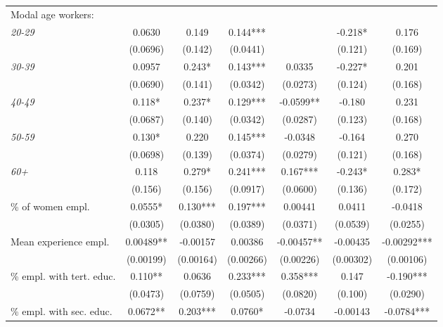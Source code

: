 \begin{threeparttable}
\begin{tabular}{l*{6}{S}}
Modal age workers:        \\[1ex]
\quad \textit{20-29}      &  0.0630    & 0.149      & 0.144***   &            & -0.218*   & 0.176       \\
                          &  (0.0696)  & (0.142)    & (0.0441)   &            & (0.121)   & (0.169)     \\[1ex]
\quad \textit{30-39}      &  0.0957    & 0.243*     & 0.143***   & 0.0335     & -0.227*   & 0.201       \\
                          &  (0.0690)  & (0.141)    & (0.0342)   & (0.0273)   & (0.124)   & (0.168)     \\[1ex]
\quad \textit{40-49}      &  0.118*    & 0.237*     & 0.129***   & -0.0599**  & -0.180    & 0.231       \\
                          &  (0.0687)  & (0.140)    & (0.0342)   & (0.0287)   & (0.123)   & (0.168)     \\[1ex]
\quad \textit{50-59}      &  0.130*    & 0.220      & 0.145***   & -0.0348    & -0.164    & 0.270       \\
                          &  (0.0698)  & (0.139)    & (0.0374)   & (0.0279)   & (0.121)   & (0.168)     \\[1ex]
\quad \textit{60+}        &  0.118     & 0.279*     & 0.241***   & 0.167***   & -0.243*   & 0.283*      \\
                          &  (0.156)   & (0.156)    & (0.0917)   & (0.0600)   & (0.136)   & (0.172)     \\[1ex]
\% of women empl.         &  0.0555*   & 0.130***   & 0.197***   & 0.00441    & 0.0411    & -0.0418     \\
                          &  (0.0305)  & (0.0380)   & (0.0389)   & (0.0371)   & (0.0539)  & (0.0255)    \\[1ex]
Mean experience empl.     &  0.00489** & -0.00157   & 0.00386    & -0.00457** & -0.00435  & -0.00292*** \\
                          &  (0.00199) & (0.00164)  & (0.00266)  & (0.00226)  & (0.00302) & (0.00106)   \\[1ex]
\% empl. with tert. educ. &  0.110**   & 0.0636     & 0.233***   & 0.358***   & 0.147     & -0.190***   \\
                          &  (0.0473)  & (0.0759)   & (0.0505)   & (0.0820)   & (0.100)   & (0.0290)    \\[1ex]
\% empl. with sec. educ.  &  0.0672**  & 0.203***   & 0.0760*    & -0.0734    & -0.00143  & -0.0784***  \\

\end{tabular}
\end{threeparttable}
